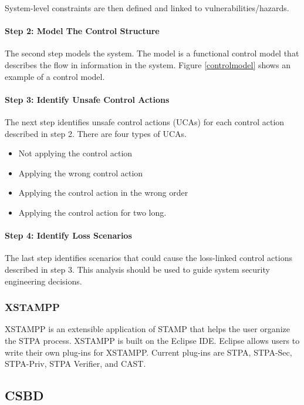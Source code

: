 \documentclass[../../main/main.tex]{subfiles}
\begin{document}
System-level constraints are then defined and linked to vulnerabilities/hazards.  


\paragraph*{Step 2: Model The Control Structure}
The second step models the system.  The model is a functional control model that describes the flow in information in the system.  Figure \ref{controlmodel} shows an example of a control model.


\paragraph*{Step 3: Identify Unsafe Control Actions}
The next step identifies unsafe control actions (UCAs) for each control action described in step 2.  There are four types of UCAs.
\begin{itemize}
\item Not applying the control action
\item Applying the wrong control action
\item Applying the control action in the wrong order
\item Applying the control action for two long.
\end{itemize}


\paragraph*{Step 4: Identify Loss Scenarios}
The last step identifies scenarios that could cause the loss-linked control actions described in step 3.  This analysis should be used to guide system security engineering decisions.


\subsubsection{XSTAMPP}\label{sssec:xstamp}
XSTAMPP is an extensible application of STAMP that helps the user organize the STPA process.  XSTAMPP is built on the Eclipse IDE.  Eclipse allows users to write their own plug-ins for XSTAMPP.  Current plug-ins are STPA, STPA-Sec, STPA-Priv, STPA Verifier, and CAST.  



\subsection{CSBD}\label{ssec:csbd}
\end{document}
